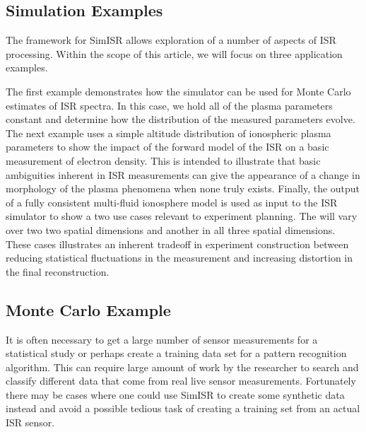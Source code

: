 \documentclass[draft,ras]{agutex}
\begin{document}
\begin{article}


\section{Simulation Examples}
The framework for SimISR allows exploration of a number of aspects of ISR processing. Within the scope of this article, we will focus on three application examples.

The first example demonstrates how the simulator can be used for Monte Carlo estimates of ISR spectra. In this case, we hold all of the plasma parameters constant and determine how the distribution of the measured parameters evolve. The next example uses a simple altitude distribution of ionospheric plasma parameters to show the impact of the forward model of the ISR on a basic measurement of electron density. This is intended to illustrate that basic ambiguities inherent in ISR measurements can give the appearance of a change in morphology of the plasma phenomena when none truly exists. Finally, the output of a fully consistent multi-fluid ionosphere model is used as input to the ISR simulator to show a two use cases relevant to experiment planning. The will vary over two two spatial dimensions and another in all three spatial dimensions. These cases illustrates an inherent tradeoff in experiment construction between reducing statistical fluctuations in the measurement and increasing distortion in the final reconstruction. 

\subsection{Monte Carlo Example}

It is often necessary to get a large number of sensor measurements for a statistical study or perhaps create a training data set for a pattern recognition algorithm. This can require large amount of work by the researcher to search and classify different data that come from real live sensor measurements. Fortunately there may be cases where one could use SimISR to create some synthetic data instead and avoid a possible tedious task of creating a training set from an actual ISR sensor.


\end{article}
\end{document}
